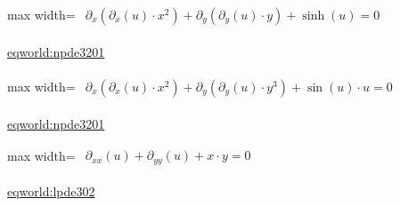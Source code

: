 \documentclass[UTF8,10pt,a4paper,fontset=mac]{ctexart}
\begin{document}
\begin{minipage}{\linewidth}\begin{center}\begin{adjustbox}{max width=\linewidth}$\displaystyle\begin{gathered}\begin{gathered}\partial_{x}(\partial_{x}(u)\cdot x^{2})+\partial_{y}(\partial_{y}(u)\cdot y)+\sinh(u)=0\end{gathered}\end{gathered}$\end{adjustbox}\end{center}{\small\href{https://eqworld.ipmnet.ru/en/solutions/npde/npde3201.pdf}{eqworld:npde3201}}\par\end{minipage}\par\vspace{6mm}

\begin{minipage}{\linewidth}\begin{center}\begin{adjustbox}{max width=\linewidth}$\displaystyle\begin{gathered}\begin{gathered}\partial_{x}(\partial_{x}(u)\cdot x^{2})+\partial_{y}(\partial_{y}(u)\cdot y^{3})+\sin(u)\cdot u=0\end{gathered}\end{gathered}$\end{adjustbox}\end{center}{\small\href{https://eqworld.ipmnet.ru/en/solutions/npde/npde3201.pdf}{eqworld:npde3201}}\par\end{minipage}\par\vspace{6mm}

\begin{minipage}{\linewidth}\begin{center}\begin{adjustbox}{max width=\linewidth}$\displaystyle\begin{gathered}\begin{gathered}\partial_{xx}(u)+\partial_{yy}(u)+x\cdot y=0\end{gathered}\end{gathered}$\end{adjustbox}\end{center}{\small\href{https://eqworld.ipmnet.ru/en/solutions/lpde/lpde302.pdf}{eqworld:lpde302}}\par\end{minipage}\par\vspace{6mm}
\end{document}
